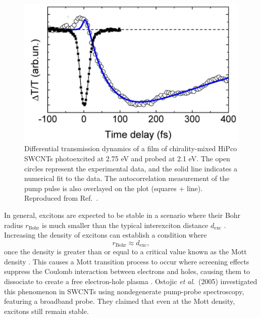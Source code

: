 \begin{figure}[H]
	\centering
	\includegraphics[scale=1.3]{images/chapter_prior_works/e33_pump_e22_probe_manzoni}
	\caption{Differential transmission dynamics of a film of chirality-mixed HiPco SWCNTs photoexcited at 2.75 eV and probed at 2.1 eV. The open circles represent the experimental data, and the solid line indicates a numerical fit to the data. The autocorrelation measurement of the pump pulse is also overlayed on the plot (squares + line). Reproduced from Ref.\ \cite{manzoni2005intersubband}.}
	\label{fig:e33_pump_manzoni}
\end{figure}


In general, excitons are expected to be stable in a scenario where their Bohr radius $r_\text{Bohr}$ is much smaller than the typical interexciton distance $d_\text{exc}$ \cite{mott1961transition}. Increasing the density of excitons can establish a condition where
\begin{equation}
r_\text{Bohr} \approx d_\text{exc},
\end{equation}
once the density is greater than or equal to a critical value known as the Mott density \cite{mott1961transition}. This causes a Mott transition process to occur where screening effects suppress the Coulomb interaction between electrons and holes, causing them to dissociate to create a free electron-hole plasma \cite{mott1961transition}. Ostojic \textit{et al}.\ (2005) investigated this phenomenon in SWCNTs using nondegenerate pump-probe spectroscopy, \cite{ostojic2005stability} featuring a broadband probe. They claimed that even at the Mott density, excitons still remain stable.

